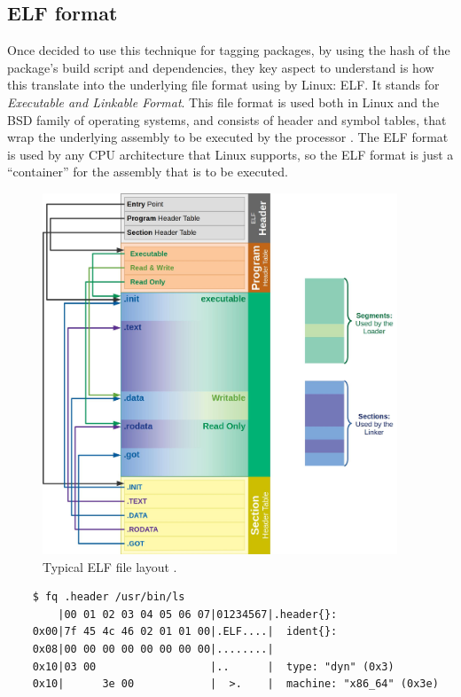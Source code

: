 \FloatBarrier
\subsection{ELF format}

Once decided to use this technique for tagging packages, by
using the hash of the package's build script and
dependencies, they key aspect to understand is how this
translate into the underlying file format using by Linux:
ELF. It stands for \textit{Executable and Linkable Format}.
This file format is used both in Linux and the BSD family of
operating systems, and consists of header and symbol tables,
that wrap the underlying assembly to be executed by the
processor \cite{LinuxFoundationReferenced}. The ELF format
is used by any CPU architecture that Linux supports, so the
ELF format is just a ``container'' for the assembly that is
to be executed.

\begin{figure}[hbt]
    \centerfloat
    \includegraphics[width=300pt]{assets/typical_elf.jpg}
    \caption{Typical ELF file layout \cite{HW3238POperating}
    .}
    \label{fig:elf-layout}
\end{figure}


    \begin{verbatim}
    $ fq .header /usr/bin/ls
        |00 01 02 03 04 05 06 07|01234567|.header{}:
    0x00|7f 45 4c 46 02 01 01 00|.ELF....|  ident{}:
    0x08|00 00 00 00 00 00 00 00|........|
    0x10|03 00                  |..      |  type: "dyn" (0x3)
    0x10|      3e 00            |  >.    |  machine: "x86_64" (0x3e)
    \end{verbatim}


